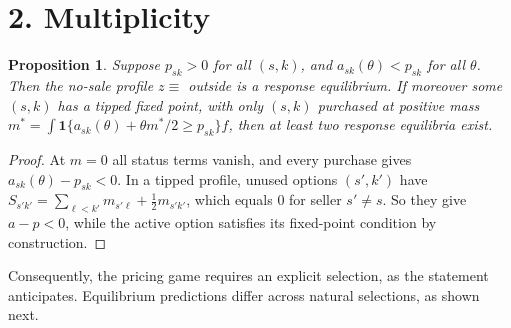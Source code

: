 \documentclass[11pt]{article}
\newtheorem{proposition}[theorem]{Proposition}
\theoremstyle{definition}
\begin{document}
\section*{2. Multiplicity}
\begin{proposition}\label{prop:mult}
Suppose $p_{sk}>0$ for all $(s,k)$, and $a_{sk}(\theta)<p_{sk}$ for all $\theta$. Then the no-sale profile $z\equiv$ outside
is a response equilibrium. If moreover some $(s,k)$ has a tipped fixed point, with only $(s,k)$ purchased at positive mass
$m^*=\int\mathbf 1\{a_{sk}(\theta)+\theta m^*/2\ge p_{sk}\}f$, then at least two response equilibria exist.
\end{proposition}
\begin{proof}
At $m=0$ all status terms vanish, and every purchase gives $a_{sk}(\theta)-p_{sk}<0$. In a tipped profile, unused options
$(s',k')$ have $S_{s'k'}=\sum_{\ell<k'}m_{s'\ell}+\tfrac12m_{s'k'}$, which equals $0$ for seller $s'\ne s$. So they give
$a-p<0$, while the active option satisfies its fixed-point condition by construction.
\end{proof}
Consequently, the pricing game requires an explicit selection, as the statement anticipates. Equilibrium predictions differ
across natural selections, as shown next.
\end{document}
